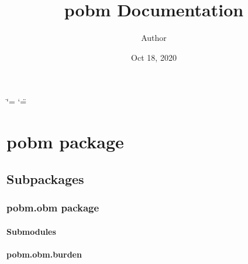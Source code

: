 \documentclass[letterpaper,10pt,english]{sphinxmanual}
\title{pobm Documentation}
\date{Oct 18, 2020}
\author{Author}
\begin{document}
\ifdefined\shorthandoff
  \ifnum\catcode`\=\string=\active\shorthandoff{=}\fi
  \ifnum\catcode`\"=\active{}\fi
\fi

\pagestyle{empty}
\sphinxmaketitle
\pagestyle{plain}
\sphinxtableofcontents
\pagestyle{normal}
\label{\detokenize{index::doc}}



\chapter{pobm package}
\label{\detokenize{pobm:pobm-package}}\label{\detokenize{pobm::doc}}

\section{Subpackages}
\label{\detokenize{pobm:subpackages}}

\subsection{pobm.obm package}
\label{\detokenize{pobm.obm:pobm-obm-package}}\label{\detokenize{pobm.obm::doc}}

\subsubsection{Submodules}
\label{\detokenize{pobm.obm:submodules}}

\subsubsection{pobm.obm.burden}
\label{\detokenize{pobm.obm:module-pobm.obm.burden}}\label{\detokenize{pobm.obm:pobm-obm-burden}}
\end{document}
